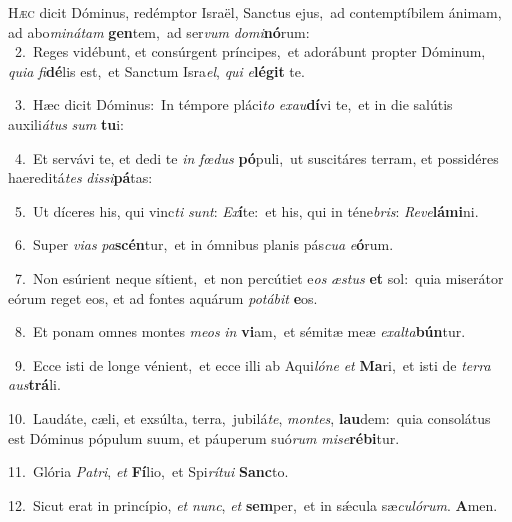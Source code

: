 \lettrine{\initial\textcolor{\initialcolor}{H}}{æc} dicit Dóminus, redémptor Israël, Sanctus ejus,~\dagger ad contemptíbilem ánimam, ad abo\-\textit{mi}\-\textit{ná}\textit{tam} \textbf{gen}\-tem,~\star ad ser\textit{vum} \textit{do}\-\textit{mi}\textbf{nó}rum:\\
{\numbfont\textcolor{\numbcolor}{~2.}}~Reges vidébunt, et consúrgent príncipes,~\dagger et adorábunt propter Dóminum, \textit{qui}\-\textit{a} \textit{fi}\-\textbf{dé}lis est,~\star et Sanctum Isra\-\textit{el}\-, \textit{qui} \textit{e}\-\textbf{lé}\textbf{git} te.\par
{\numbfont\textcolor{\numbcolor}{~3.}}~Hæc dicit Dóminus:~\dagger In témpore pláci\textit{to} \textit{ex}\-\textit{au}\textbf{dí}vi te,~\star et in die salútis auxili\-\textit{á}\-\textit{tus} \textit{sum} \textbf{tu}\-i:\par
{\numbfont\textcolor{\numbcolor}{~4.}}~Et servávi te, et dedi te \textit{in} \textit{fœ}\-\textit{dus} \textbf{pó}\-puli,~\star ut suscitáres terram, et possidéres haereditá\textit{tes} \textit{dis}\-\textit{si}\textbf{pá}tas:\par
{\numbfont\textcolor{\numbcolor}{~5.}}~Ut díceres his, qui vinc\textit{ti} \textit{sunt}\-: \textit{Ex}\-\textbf{í}te:~\star et his, qui in téne\-\textit{bris}\-: \textit{Re}\-\textit{ve}\textbf{lá}\textbf{mi}ni.\par
{\numbfont\textcolor{\numbcolor}{~6.}}~Super \textit{vi}\-\textit{as} \textit{pa}\-\textbf{scén}tur,~\star et in ómnibus planis pás\-\textit{cu}\-\textit{a} \textit{e}\-\textbf{ó}rum.\par
{\numbfont\textcolor{\numbcolor}{~7.}}~Non esúrient neque sítient,~\dagger et non percútiet e\textit{os} \textit{æs}\-\textit{tus} \textbf{et} sol:~\star quia miserátor eórum reget eos, et ad fontes aquárum \textit{po}\-\textit{tá}\textit{bit} \textbf{e}\-os.\par
{\numbfont\textcolor{\numbcolor}{~8.}}~Et ponam omnes montes \textit{me}\-\textit{os} \textit{in} \textbf{vi}\-am,~\star et sémitæ meæ \textit{ex}\-\textit{al}\textit{ta}\textbf{bún}tur.\par
{\numbfont\textcolor{\numbcolor}{~9.}}~Ecce isti de longe vénient,~\dagger et ecce illi ab Aqui\-\textit{ló}\-\textit{ne} \textit{et} \textbf{Ma}\-ri,~\star et isti de \textit{ter}\-\textit{ra} \textit{aus}\-\textbf{trá}li.\par
{\numbfont\textcolor{\numbcolor}{10.}}~Laudáte, cæli, et exsúlta, terra,~\dagger jubilá\-\textit{te}\-, \textit{mon}\-\textit{tes}, \textbf{lau}\-dem:~\star quia consolátus est Dóminus pópulum suum, et páuperum suó\textit{rum} \textit{mi}\-\textit{se}\textbf{ré}\textbf{bi}tur.\par
{\numbfont\textcolor{\numbcolor}{11.}}~Glória \textit{Pa}\-\textit{tri}, \textit{et} \textbf{Fí}\-lio,~\star et Spi\-\textit{rí}\-\textit{tu}\textit{i} \textbf{Sanc}\-to.\par
{\numbfont\textcolor{\numbcolor}{12.}}~Sicut erat in princípio, \textit{et} \textit{nunc}\-, \textit{et} \textbf{sem}\-per,~\star et in sǽcula sæ\-\textit{cu}\-\textit{ló}\textit{rum}. \textbf{A}\-men.\par
